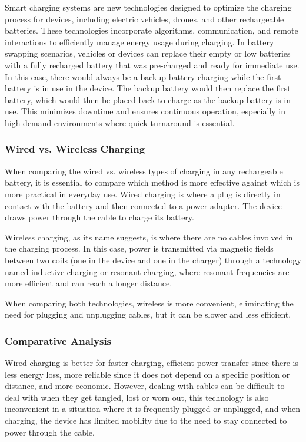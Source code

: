 \documentclass{article}
\begin{document}
Smart charging systems are new technologies designed to optimize the charging process for devices, including electric vehicles, drones, and other rechargeable batteries. These technologies incorporate algorithms, communication, and remote interactions to efficiently manage energy usage during charging. In battery swapping scenarios, vehicles or devices can replace their empty or low batteries with a fully recharged battery that was pre-charged and ready for immediate use. In this case, there would always be a backup battery charging while the first battery is in use in the device. The backup battery would then replace the first battery, which would then be placed back to charge as the backup battery is in use. This minimizes downtime and ensures continuous operation, especially in high-demand environments where quick turnaround is essential. 
\cite{vehiclessmartcharge}

\subsubsection{Wired vs. Wireless Charging}
When comparing the wired vs. wireless types of charging in any rechargeable battery, it is essential to compare which method is more effective against which is more practical in everyday use. Wired charging is where a plug is directly in contact with the battery and then connected to a power adapter. The device draws power through the cable to charge its battery. 

Wireless charging, as its name suggests, is where there are no cables involved in the charging process. In this case, power is transmitted via magnetic fields between two coils (one in the device and one in the charger) through a technology named inductive charging or resonant charging, where resonant frequencies are more efficient and can reach a longer distance. 

When comparing both technologies, wireless is more convenient, eliminating the need for plugging and unplugging cables, but it can be slower and less efficient.
\cite{wiredvwirelessMohammed}

\subsubsection{Comparative Analysis}
Wired charging is better for faster charging, efficient power transfer since there is less energy loss, more reliable since it does not depend on a specific position or distance, and more economic. However, dealing with cables can be difficult to deal with when they get tangled, lost or worn out, this technology is also inconvenient in a situation where it is frequently plugged or unplugged, and when charging, the device has limited mobility due to the need to stay connected to power through the cable. 
\end{document}
